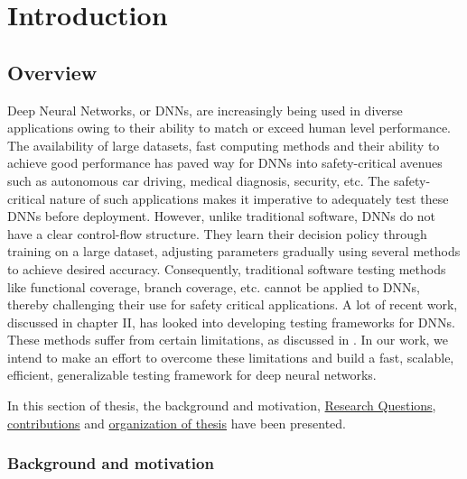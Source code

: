 
\chapter[Introduction]{Introduction}
\label{chp:1}
\newpage
\section{Overview}
Deep Neural Networks, or DNNs, are increasingly being
used in diverse applications owing to their ability to match
or exceed human level performance. The availability of large
datasets, fast computing methods and their ability to achieve
good performance has paved way for DNNs into safety-critical
avenues such as autonomous car driving, medical diagnosis,
security, etc. The safety-critical nature of such applications
makes it imperative to adequately test these DNNs before
deployment. However, unlike traditional software, DNNs do
not have a clear control-flow structure. They learn their
decision policy through training on a large dataset, adjusting
parameters gradually using several methods to achieve desired
accuracy. Consequently, traditional software testing methods
like functional coverage, branch coverage, etc. cannot be
applied to DNNs, thereby challenging their use for safety critical applications.
A lot of recent work, discussed in chapter II, has looked into
developing testing frameworks for DNNs. These methods
suffer from certain limitations, as discussed in \hypertarget{challenges}{}. In our work,
we intend to make an effort to overcome these limitations and
build a fast, scalable, efficient, generalizable testing framework for
deep neural networks. 

In this section of thesis, the background and motivation,  \hyperlink{researchquestions}{Research Questions}, \hyperlink{contributions}{contributions} and \hyperlink{organization of thesis}{organization of thesis} have been presented.

\subsection{Background and motivation}


